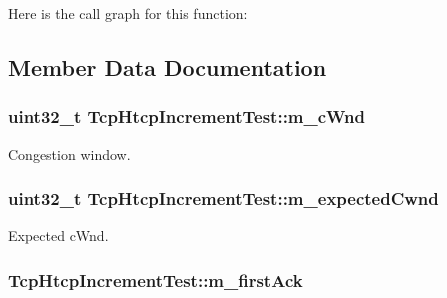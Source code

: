 Here is the call graph for this function\+:




\subsection{Member Data Documentation}
\subsubsection[{\texorpdfstring{m\+\_\+c\+Wnd}{m_cWnd}}]{\setlength{\rightskip}{0pt plus 5cm}uint32\+\_\+t Tcp\+Htcp\+Increment\+Test\+::m\+\_\+c\+Wnd\hspace{0.3cm}{\ttfamily [private]}}\hypertarget{classTcpHtcpIncrementTest_a76dde1fff1851661480d009b05064d5d}{}\label{classTcpHtcpIncrementTest_a76dde1fff1851661480d009b05064d5d}


Congestion window. 

\subsubsection[{\texorpdfstring{m\+\_\+expected\+Cwnd}{m_expectedCwnd}}]{\setlength{\rightskip}{0pt plus 5cm}uint32\+\_\+t Tcp\+Htcp\+Increment\+Test\+::m\+\_\+expected\+Cwnd\hspace{0.3cm}{\ttfamily [private]}}\hypertarget{classTcpHtcpIncrementTest_acb68aafab99bed10ddc20740386adb90}{}\label{classTcpHtcpIncrementTest_acb68aafab99bed10ddc20740386adb90}


Expected c\+Wnd. 

\subsubsection[{\texorpdfstring{m\+\_\+first\+Ack}{m_firstAck}}]{ Tcp\+Htcp\+Increment\+Test\+::m\+\_\+first\+Ack\hspace{0.3cm}{\ttfamily [private]}}\hypertarget{classTcpHtcpIncrementTest_ae12dc2d9ff37347a0e7e11c1fa61ccf4}{}\label{classTcpHtcpIncrementTest_ae12dc2d9ff37347a0e7e11c1fa61ccf4}



